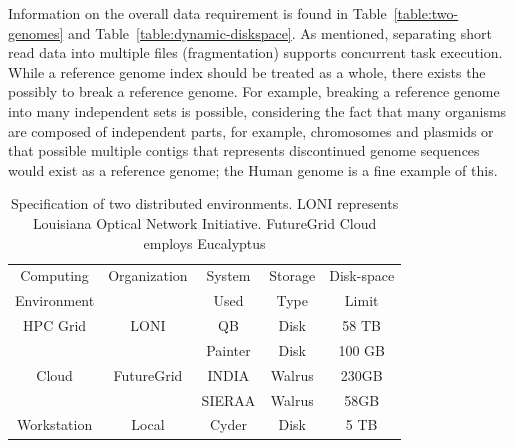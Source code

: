 \documentclass{acm_proc_article-sp}
\begin{document}

Information on the overall data requirement is found in
Table~\ref{table:two-genomes} and
Table~\ref{table:dynamic-diskspace}. As mentioned, separating short
read data into multiple files (fragmentation) supports concurrent task
execution.  While a reference genome index should be treated as a
whole, there exists the possibly to break a reference genome.  For
example, breaking a reference genome into many independent sets is
possible, considering the fact that many organisms are composed of
independent parts, for example, chromosomes and plasmids or that
possible multiple contigs that represents discontinued genome
sequences would exist as a reference genome; the Human genome is a
fine example of this.

\begin{table}
\small
\begin{tabular}{|c|c|c|c|c|} 
\hline 
Computing & Organization & System &  Storage & Disk-space  \\
Environment & & Used & Type  &  Limit \\ \hline
HPC Grid & LONI & QB & Disk & 58 TB   \\
 &  &  Painter  & Disk &  100 GB  \\
Cloud & FutureGrid & INDIA & Walrus & 230GB \\
         &                    &  SIERAA & Walrus & 58GB \\ 
Workstation &  Local   &  Cyder & Disk       & 5 TB\\

 \hline


 \end{tabular}
\caption{Specification of two distributed environments. LONI represents Louisiana Optical Network Initiative\cite{loni}. FutureGrid Cloud\cite{futuregrid} employs Eucalyptus}
\label{table:two-systems} 
\end{table}


\end{document}
